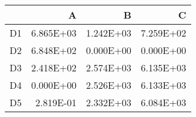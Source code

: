 \begin{tabular}{lrrr}
\toprule
     &         A &         B &         C \\
\midrule
 D1  & \num{6.865E+03} & \num{1.242E+03} & \num{7.259E+02} \\
 D2  & \num{6.848E+02} & \num{0.000E+00} & \num{0.000E+00} \\
 D3  & \num{2.418E+02} & \num{2.574E+03} & \num{6.135E+03} \\
 D4  & \num{0.000E+00} & \num{2.526E+03} & \num{6.133E+03} \\
 D5  & \num{2.819E-01} & \num{2.332E+03} & \num{6.084E+03} \\
\bottomrule
\end{tabular}